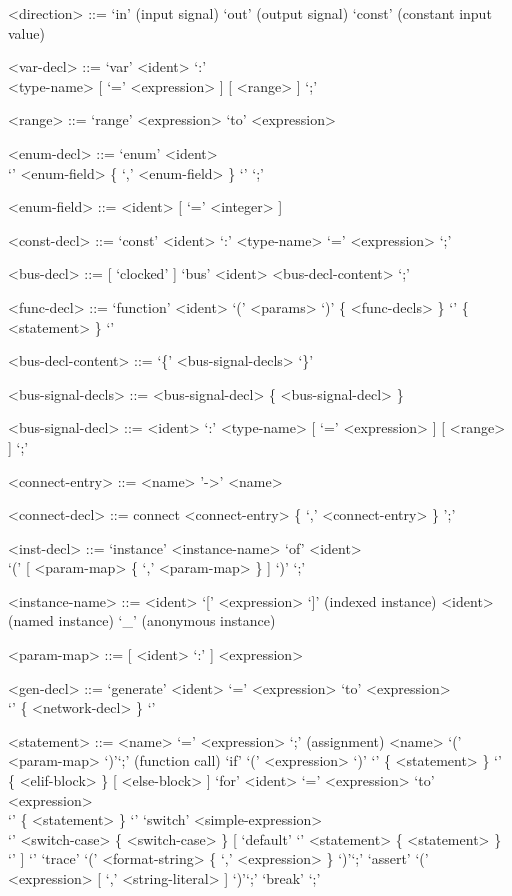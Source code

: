 \documentclass{article}
\begin{document}
\begin{grammar}
  <direction> ::= `in' (input signal)
  \alt `out' (output signal)
  \alt `const' (constant input value)  

  <var-decl> ::= `var' <ident> `:' \\ <type-name> [ `=' <expression> ] [ <range> ] `;'

  <range> ::= `range' <expression> `to' <expression>

  <enum-decl> ::= `enum' <ident> \\ `{' <enum-field> \{ `,' <enum-field>  \} `}' `;'

  <enum-field> ::= <ident> [ `=' <integer> ]
  
  <const-decl> ::= `const' <ident> `:' <type-name> `=' <expression> `;'

  <bus-decl> ::= [ `clocked' ] `bus' <ident> <bus-decl-content> `;'

  <func-decl> ::= `function' <ident> `(' <params> `)' \{ <func-decls> \} `{' \{ <statement> \}  `}'

  <bus-decl-content> ::= `\{' <bus-signal-decls> `\}'

  <bus-signal-decls> ::= <bus-signal-decl> \{ <bus-signal-decl> \}

  <bus-signal-decl> ::= <ident> `:' <type-name> [ `=' <expression> ] [ <range> ] `;'

  <connect-entry> ::= <name> '->' <name>

  <connect-decl> ::= connect <connect-entry> \{ `,' <connect-entry> \} ';'

  <inst-decl> ::= `instance' <instance-name> `of' <ident> \\`(' [ <param-map> 
  \{ `,' <param-map> \} ] `)' `;'

  <instance-name> ::= <ident> `[' <expression> `]' (indexed instance)
  \alt <ident> (named instance)
  \alt `_' (anonymous instance)

  <param-map> ::= [ <ident> `:' ] <expression>

  <gen-decl> ::= `generate' <ident> `=' <expression> `to' <expression> \\ `{' \{ <network-decl> \} `}'

  <statement> ::= <name> `=' <expression> `;' (assignment)
  \alt <name> `(' <param-map> `)'`;' (function call) 
  \alt `if' `(' <expression> `)' `{' \{ <statement> \} `}' \\ \{ <elif-block>
    \} [ <else-block> ]
  \alt `for' <ident> `=' <expression> `to' <expression> \\ `{' \{ <statement> \} `}'
  \alt `switch' <simple-expression> \\ `{' <switch-case> \{ <switch-case> \} [ `default' `{' <statement> \{ <statement> \} `}' ] `}'
  \alt `trace' `(' <format-string> \{ `,' <expression> \} `)'`;'
  \alt `assert' `(' <expression> [ `,' <string-literal> ] `)'`;'
  \alt `break' `;'


\end{grammar}
\end{document}
